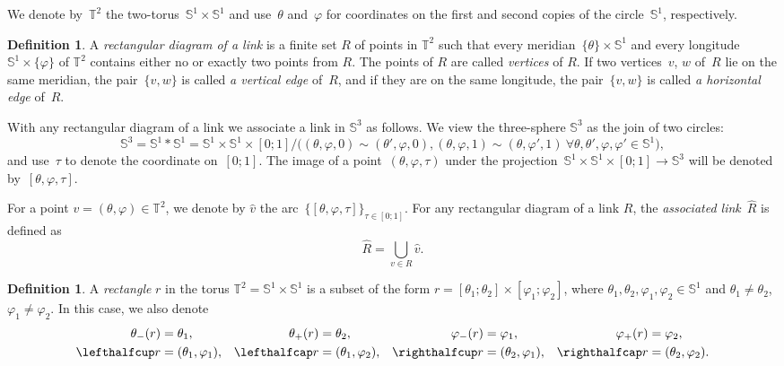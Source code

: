\documentclass{amsart}
\def\cabl#1{\lefthalfcup#1}
\def\cabr#1{\righthalfcup#1}
\def\catl#1{\lefthalfcap#1}
\def\catr#1{\righthalfcap#1}
\theoremstyle{theorem}
\theoremstyle{remark}
\theoremstyle{definition}
\newtheorem{defi}[theo]{Definition}
\numberwithin{equation}{section}
\numberwithin{figure}{section}
\begin{document}
We denote by~$\mathbb T^2$ the two-torus~$\mathbb S^1\times\mathbb S^1$ and use~$\theta$ and~$\varphi$
for coordinates on the first and second copies of the circle~$\mathbb S^1$, respectively.

\begin{defi}
A \emph{rectangular diagram of a link} is a finite set $R$ of points in $\mathbb T^2$ such that every
meridian~$\{\theta\}\times\mathbb S^1$ and every longitude~$\mathbb S^1\times\{\varphi\}$ of $\mathbb T^2$ contains either no or exactly two points from $R$. The points of $R$ are called \emph{vertices} of $R$. If two vertices~$v$, $w$ of~$R$ lie
on the same meridian, the pair~$\{v,w\}$ is called \emph{a vertical edge} of~$R$, and if they are
on the same longitude, the pair~$\{v,w\}$ is called \emph{a horizontal edge} of~$R$.
\end{defi}

With any rectangular diagram of a link we associate a link in $\mathbb S^3$ as follows.  We view the three-sphere $\mathbb S^3$ as the join of two circles:
\begin{equation}\label{join-eq}
    \mathbb S^3 = \mathbb S^1 * \mathbb S^1 = \mathbb S^1 \times \mathbb S^1 \times [0; 1] /\bigl((\theta, \varphi, 0) \sim (\theta', \varphi, 0), (\theta, \varphi, 1)\sim (\theta, \varphi', 1)\ \forall\theta,\theta',\varphi,\varphi'\in\mathbb S^1\bigr),
\end{equation}
and use~$\tau$ to denote the coordinate on~$[0;1]$. The image of a point~$(\theta,\varphi,\tau)$
under the projection~$\mathbb S^1\times\mathbb S^1\times[0;1]\rightarrow\mathbb S^3$ will be denoted by~$[\theta,\varphi,\tau]$.

For a point $v = (\theta, \varphi) \in \mathbb T^2$, we denote by $\widehat v$  the arc~$\{[\theta,\varphi,\tau]\}_{\tau\in[0;1]}$. For any rectangular diagram of a link $R$, the \emph{associated link}~$\widehat R$
is defined as
$$\widehat R = \bigcup_{v\in R} \widehat v.$$

\begin{defi}
A \emph{rectangle} $r$
in the torus $\mathbb T^2 = \mathbb S^1 \times \mathbb S^1$ is a subset of the form $r=[\theta_1; \theta_2] \times [\varphi_1; \varphi_2]$, where $\theta_1, \theta_2, \varphi_1, \varphi_2 \in \mathbb S^1$ and $\theta_1 \ne \theta_2$, $\varphi_1 \ne \varphi_2$.
In this case, we also denote
$$\begin{aligned}
\theta_-(r)&= \theta_1,&\theta_+(r)&= \theta_2,&\varphi_-(r)&= \varphi_1,&\varphi_+(r)&= \varphi_2,\\
\cabl r&=(\theta_1,\varphi_1),&\catl r&=(\theta_1,\varphi_2),&\cabr r&=(\theta_2,\varphi_1),&\catr r&=(\theta_2,\varphi_2).
\end{aligned}$$
\end{defi}
\end{document}
